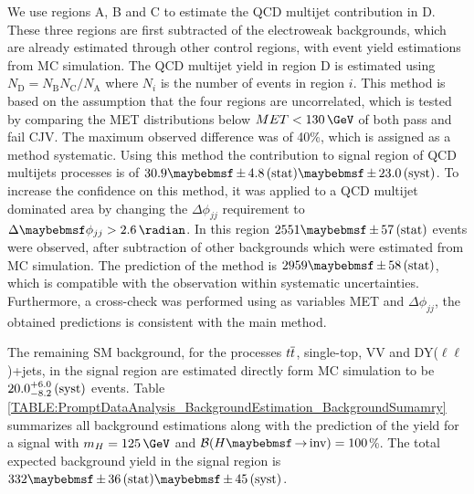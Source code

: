 We use regions A, B and C to estimate the \gls{QCD} multijet contribution in D. These three regions are first subtracted of the electroweak backgrounds, which are already estimated through other control regions, with event yield estimations from \gls{MC} simulation. The \gls{QCD} multijet yield in region D is estimated using $N_\mathrm{D} = N_\mathrm{B}N_\mathrm{C} / N_\mathrm{A}$ where $N_{i}$ is the number of events in region $i$. This method is based on the assumption that the four regions are uncorrelated, which is tested by comparing the \gls{MET} distributions below $MET < 130\,\GeV$ of both pass and fail \gls{CJV}. The maximum observed difference was of 40\%, which is assigned as a method systematic. Using this method the contribution to signal region of \gls{QCD} multijets processes is of $30.9 \pm 4.8\stat \pm 23.0\syst$. To increase the confidence on this method, it was applied to a \gls{QCD} multijet dominated area by changing the $\Delta\phi_{jj}$ requirement to $\Delta\phi_{jj}>2.6\,\radian$. In this region $2551 \pm 57\stat$ events were observed, after subtraction of other backgrounds which were estimated from \gls{MC} simulation. The prediction of the method is $2959 \pm 58\stat$, which is compatible with the observation within systematic uncertainties. Furthermore, a cross-check was performed using as variables \gls{MET} and $\Delta\phi_{jj}$, the obtained predictions is consistent with the main method.

The remaining \gls{SM} background, for the processes $t\overline{t}$, single-top, VV and DY($\ell\ell$)+jets, in the signal region are estimated  directly form \gls{MC} simulation to be $20.0 ^{+6.0}_{-8.2}\,\text{(syst)}$ events. Table \ref{TABLE:PromptDataAnalysis_BackgroundEstimation_BackgroundSumamry} summarizes all background estimations along with the prediction of the yield for a signal with $m_{H}=125\,\GeV$ and $\BRinv=100$\%. The total expected background yield in the signal region is $332 \pm 36\stat \pm 45\syst$. 

